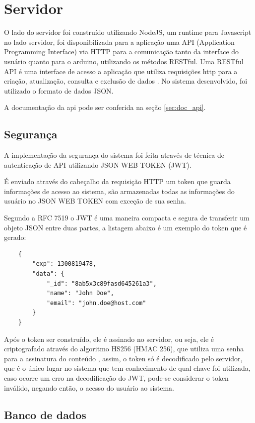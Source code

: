 \section{Servidor}
\label{sec:servidor}

O lado do servidor foi construído utilizando NodeJS, um runtime para Javascript no lado servidor, foi disponibilizada para a aplicação uma API (Application Programming Interface) via HTTP para a comunicação tanto da interface do usuário quanto para o arduino, utilizando os métodos RESTful.
Uma RESTful API é uma interface de acesso a aplicação que utiliza requisições http para a criação, atualização, consulta e exclusão de dados \cite{restful_api}. No sistema desenvolvido, foi utilizado o formato de dados JSON.

A documentação da api pode ser conferida na seção \ref{sec:doc_api}.

\subsection{Segurança}

A implementação da segurança do sistema foi feita através de técnica de autenticação de API utilizando JSON WEB TOKEN (JWT).

É enviado através do cabeçalho da requisição HTTP um token que guarda informações de acesso ao sistema, são armazenadas todas as informações do usuário no JSON WEB TOKEN com exceção de sua senha.

Segundo a RFC 7519 \cite{rfc_jwt} o JWT é uma maneira compacta e segura de transferir um objeto JSON entre duas partes, a listagem abaixo é um exemplo do token que é gerado:

\begin{lstlisting}
    {
        "exp": 1300819478,
        "data": {
            "_id": "8ab5x3c89fasd645261a3",
            "name": "John Doe",
            "email": "john.doe@host.com"
        }
    }
\end{lstlisting}

Após o token ser construído, ele é assinado no servidor, ou seja, ele é criptografado através do algoritmo HS256 (HMAC 256), que utiliza uma senha para a assinatura do conteúdo \cite{hmac}, assim, o token só é decodificado pelo servidor, que é o único lugar no sistema que tem conhecimento de qual chave foi utilizada, caso ocorre um erro na decodificação do JWT, pode-se considerar o token inválido, negando então, o acesso do usuário ao sistema.

\subsection{Banco de dados}

